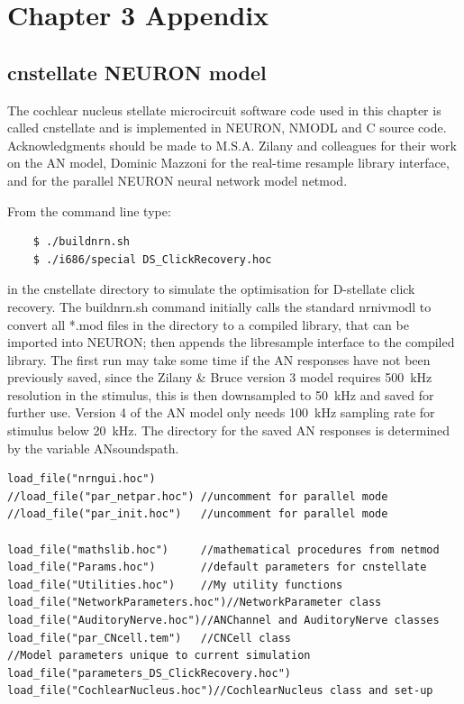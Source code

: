 \graphicspath{{../figures/}{./gfx/}{/media/data/Work/cnstellate/}{/media/data/Work/cnstellate/Responses/}}

\chapter{Chapter 3 Appendix}\label{sec:ch3appendix}
\section{\textsf{cnstellate} NEURON model}

The cochlear nucleus stellate microcircuit software code used in this chapter is
called \textsf{cnstellate} and is implemented in NEURON, NMODL and C source
code. Acknowledgments should be made to M.S.A. Zilany and colleagues for their
work on the AN model, Dominic Mazzoni for the real-time resample library
interface, and \citet{MiglioreCanniaEtAl:2006} for the parallel NEURON
neural network model \textsf{netmod}.

From the command line type:
\begin{verbatim}
    $ ./buildnrn.sh
    $ ./i686/special DS_ClickRecovery.hoc
\end{verbatim}
in the \textsf{cnstellate} directory to simulate the optimisation for D-stellate
click recovery.  The \textsf{buildnrn.sh} command initially calls the standard
\textsf{nrnivmodl} to convert all *.mod files in the directory to a compiled
library, that can be imported into NEURON; then appends the libresample
interface to the compiled library. The first run may take some time if the AN
responses have not been previously saved, since the Zilany \& Bruce version 3
model requires 500~kHz resolution in the stimulus, this is then downsampled to
50~kHz and saved for further use. Version 4 of the AN model
\citep{ZilanyBruceEtAl:2009} only needs 100~kHz sampling rate for stimulus below
20~kHz. The directory for the saved AN responses is determined by the variable
\textsf{ANsoundspath}.

\begin{lstlisting}[label=lst:headerlines,caption={Headerlines in \mbox{\textsf{DS\_Recover\.hoc}} show a typical setup in a \texsf{cnstellate} setup.}]
load_file("nrngui.hoc")
//load_file("par_netpar.hoc") //uncomment for parallel mode
//load_file("par_init.hoc")   //uncomment for parallel mode

load_file("mathslib.hoc")     //mathematical procedures from netmod
load_file("Params.hoc")       //default parameters for cnstellate  
load_file("Utilities.hoc")    //My utility functions 
load_file("NetworkParameters.hoc")//NetworkParameter class
load_file("AuditoryNerve.hoc")//ANChannel and AuditoryNerve classes 
load_file("par_CNcell.tem")   //CNCell class
//Model parameters unique to current simulation
load_file("parameters_DS_ClickRecovery.hoc") 
load_file("CochlearNucleus.hoc")//CochlearNucleus class and set-up

\end{lstlisting}


